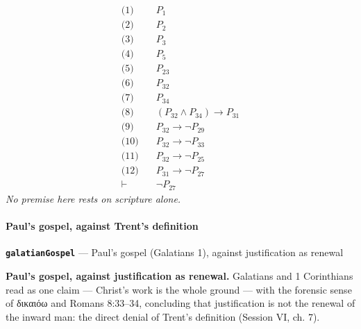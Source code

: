 \documentclass[11pt]{article}
\begin{document}
\begin{align*}
  \text{(1)} \quad & P_{1} \\
  \text{(2)} \quad & P_{2} \\
  \text{(3)} \quad & P_{3} \\
  \text{(4)} \quad & P_{5} \\
  \text{(5)} \quad & P_{23} \\
  \text{(6)} \quad & P_{32} \\
  \text{(7)} \quad & P_{34} \\
  \text{(8)} \quad & (P_{32} \land P_{34}) \rightarrow P_{31} \\
  \text{(9)} \quad & P_{32} \rightarrow \lnot P_{29} \\
  \text{(10)} \quad & P_{32} \rightarrow \lnot P_{33} \\
  \text{(11)} \quad & P_{32} \rightarrow \lnot P_{25} \\
  \text{(12)} \quad & P_{31} \rightarrow \lnot P_{27} \\
  \vdash \quad & \lnot P_{27}
\end{align*}
\emph{No premise here rests on scripture alone.}
\paragraph*{Paul's gospel, against Trent's definition}
\leavevmode\par
\par\medskip\noindent\textbf{\texttt{galatian\allowbreak{}Gospel}} --- Paul's gospel (Galatians 1), against justification as renewal\par\nobreak\noindent
\textbf{Paul's gospel, against justification as renewal.} Galatians and 1 Corinthians read as one claim — Christ's work is the whole ground — with the forensic sense of δικαιόω and Romans 8:33–34, concluding that justification is not the renewal of the inward man: the direct denial of Trent's definition (Session VI, ch. 7).
\end{document}
